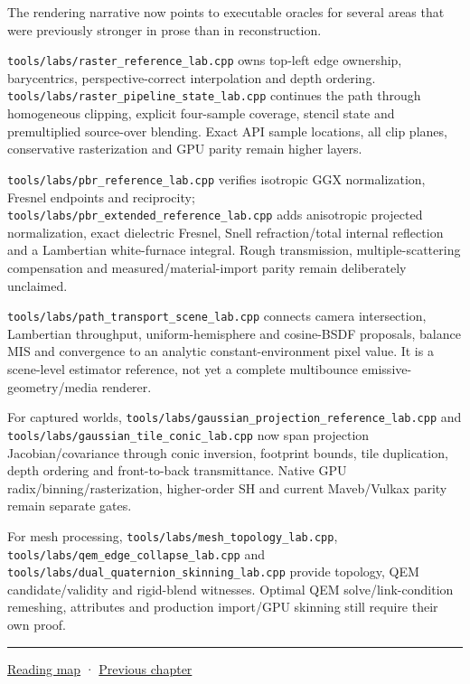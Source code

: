 The rendering narrative now points to executable oracles for several areas that were previously stronger in prose than in reconstruction.

\texttt{tools/labs/raster\_reference\_lab.cpp} owns top-left edge ownership, barycentrics, perspective-correct interpolation and depth ordering. \texttt{tools/labs/raster\_pipeline\_state\_lab.cpp} continues the path through homogeneous clipping, explicit four-sample coverage, stencil state and premultiplied source-over blending. Exact API sample locations, all clip planes, conservative rasterization and GPU parity remain higher layers.

\texttt{tools/labs/pbr\_reference\_lab.cpp} verifies isotropic GGX normalization, Fresnel endpoints and reciprocity; \texttt{tools/labs/pbr\_extended\_reference\_lab.cpp} adds anisotropic projected normalization, exact dielectric Fresnel, Snell refraction/total internal reflection and a Lambertian white-furnace integral. Rough transmission, multiple-scattering compensation and measured/material-import parity remain deliberately unclaimed.

\texttt{tools/labs/path\_transport\_scene\_lab.cpp} connects camera intersection, Lambertian throughput, uniform-hemisphere and cosine-BSDF proposals, balance MIS and convergence to an analytic constant-environment pixel value. It is a scene-level estimator reference, not yet a complete multibounce emissive-geometry/media renderer.

For captured worlds, \texttt{tools/labs/gaussian\_projection\_reference\_lab.cpp} and \texttt{tools/labs/gaussian\_tile\_conic\_lab.cpp} now span projection Jacobian/covariance through conic inversion, footprint bounds, tile duplication, depth ordering and front-to-back transmittance. Native GPU radix/binning/rasterization, higher-order SH and current Maveb/Vulkax parity remain separate gates.

For mesh processing, \texttt{tools/labs/mesh\_topology\_lab.cpp}, \texttt{tools/labs/qem\_edge\_collapse\_lab.cpp} and \texttt{tools/labs/dual\_quaternion\_skinning\_lab.cpp} provide topology, QEM candidate/validity and rigid-blend witnesses. Optimal QEM solve/link-condition remeshing, attributes and production import/GPU skinning still require their own proof.

\begin{center}\rule{0.5\linewidth}{0.5pt}\end{center}

\hyperref[volume-reading-map]{Reading map} · \hyperref[04-visual-computing-ii-ch042-xr-radiometry-optics-and-perception]{Previous chapter}
